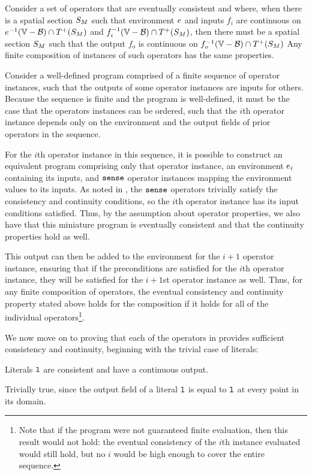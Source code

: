 \documentclass[12pt,a4paper,twoside,openright]{book}
\begin{document}
\begin{appendices}
\begin{lem}\label{thm:compose}
  Consider a set of operators that are eventually consistent and where, when there is a spatial section $S_{M}$ such that environment $e$ and inputs $f_i$ are continuous on $\validdomain{\environment} \cap \futureof{\sectionof{\manifold}}$ and  $\validdomain{\field_i} \cap \futureof{\sectionof{\manifold}}$, then there must be a spatial section $S_{M}$ such that the output $f_o$ is continuous on $\validdomain{\field_o} \cap \futureof{\sectionof{\manifold}}$
  Any finite composition of instances of such operators has the same properties.
\end{lem}
  Consider a well-defined program comprised of a finite sequence of operator instances, such that the outputs of some operator instances are inputs for others.  Because the sequence is finite and the program is well-defined, it must be the case that the operators instances can be ordered, such that the $i$th operator instance depends only on the environment and the output fields of prior operators in the sequence.

  For the $i$th operator instance in this sequence, it is possible to construct an equivalent program comprising only that operator instance, an environment $e_i$ containing its inputs, and $\texttt{sense}$ operator instances mapping the environment values to its inputs.
  As noted in , the $\texttt{sense}$ operators trivially satisfy the consistency and continuity conditions, so the $i$th operator instance has its input conditions satisfied.
  Thus, by the assumption about operator properties, we also have that this miniature program is eventually consistent and that the continuity properties hold as well.

  This output can then be added to the environment for the $i+1$ operator instance, ensuring that if the preconditions are satisfied for the $i$th operator instance, they will be satisfied for the $i+1$st operator instance as well.
  Thus, for any finite composition of operators, the eventual consistency and continuity property stated above holds for the composition if it holds for all of the individual operators\footnote{Note that if the program were not guaranteed finite evaluation, then this result would not hold: the eventual consistency of the $i$th instance evaluated would still hold, but no $i$ would be high enough to cover the entire sequence.}.

We now move on to proving that each of the operators in \calculus{} provides sufficient consistency and continuity, beginning with the trivial case of literals:
\begin{lem}\label{thm:lit}
  Literals $\texttt{l}$ are consistent and have a continuous output. 
\end{lem}
  Trivially true, since the output field of a literal $\texttt{l}$ is equal to $\texttt{l}$ at every point in its domain.


\end{appendices}
\end{document}
